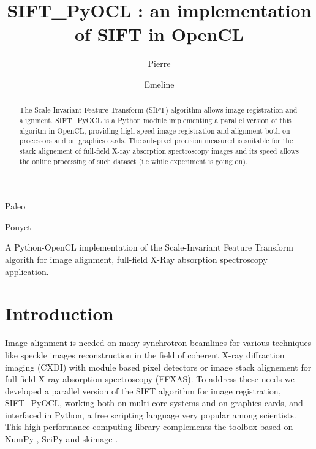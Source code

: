 \documentclass[preprint]{iucr}
\begin{document}
\title{SIFT\_PyOCL : an implementation of SIFT in OpenCL}

    \author[a]{Pierre}{Paleo}
    \author[a]{Emeline}{Pouyet}

\maketitle

\begin{synopsis}
A Python-OpenCL implementation of the  Scale-Invariant Feature Transform
algorith for image alignment, full-field X-Ray absorption
spectroscopy application.
\end{synopsis}

\begin{abstract}
The Scale Invariant Feature Transform (SIFT) algorithm allows image registration
and alignment. 
SIFT\_PyOCL is a Python module implementing a parallel version of this algoritm
in OpenCL,  providing high-speed image registration and alignment both on
processors and on graphics cards. 
The sub-pixel precision measured is suitable for the stack alignement of 
full-field X-ray absorption spectroscopy images and its speed allows the online
processing of such dataset (i.e while experiment is going on).

\end{abstract}

\section{Introduction}

Image alignment is needed on many synchrotron beamlines for
various techniques like speckle images reconstruction in the field of coherent
X-ray diffraction imaging (CXDI) with module based pixel detectors or image
stack alignement for full-field X-ray absorption spectroscopy (FFXAS).
To address these needs we developed a parallel
version of the SIFT algorithm for image registration, SIFT\_PyOCL, working both
on multi-core systems and on graphics cards, and interfaced in Python, a free
scripting language very popular among scientists. 
This high performance computing library complements
the toolbox based on NumPy \cite{numpy}, SciPy \cite{scipy} and
skimage \cite{skimage}.
\end{document}

